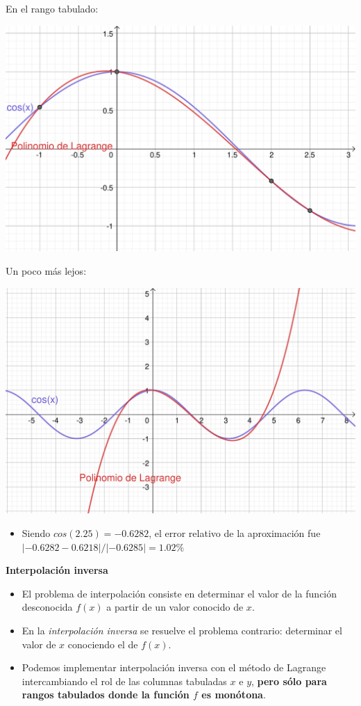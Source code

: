 \documentclass[openany]{book}
\providecommand{\tightlist}{%
  \setlength{\itemsep}{0pt}\setlength{\parskip}{0pt}}
\begin{document}
En el rango tabulado:

\begin{center}\includegraphics[width=1\linewidth]{Plots/U4/lagrange2} \end{center}

Un poco más lejos:

\begin{center}\includegraphics[width=1\linewidth]{Plots/U4/lagrange} \end{center}

\begin{itemize}
\tightlist
\item
  Siendo \(cos(2.25) = -0.6282\), el error relativo de la aproximación fue \(|-0.6282-0.6218| / |-0.6285| = 1.02\%\)
\end{itemize}

\textbf{Interpolación inversa}

\begin{itemize}
\tightlist
\item
  El problema de interpolación consiste en determinar el valor de la función desconocida \(f(x)\) a partir de un valor conocido de \(x\).
\item
  En la \emph{interpolación inversa} se resuelve el problema contrario: determinar el valor de \(x\) conociendo el de \(f(x)\).
\item
  Podemos implementar interpolación inversa con el método de Lagrange intercambiando el rol de las columnas tabuladas \(x\) e \(y\), \textbf{pero sólo para rangos tabulados donde la función \(f\) es monótona}.
\end{itemize}
\end{document}
